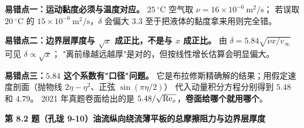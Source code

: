 \begin{yicuo}
\textbf{易错点一：运动黏度必须与温度对应。}
$25\ ^{\circ}\mathrm{C}$ 空气取 $\nu=16\times10^{-6}\ \mathrm{m^2/s}$；
若误取 $20\ ^{\circ}\mathrm{C}$ 的 $15\times10^{-6}\ \mathrm{m^2/s}$，$\delta$ 会偏大 3.3%
至于把液体的黏度拿来用则完全错。

\textbf{易错点二：边界层厚度与 $\sqrt{x}$ 成正比，不是与 $x$ 成正比。}
由 $\delta=5.84\sqrt{\nu x/v_\infty}$ 可见 $\delta\propto\sqrt{x}$；
"离前缘越远越厚"是对的，但按线性增长估算会明显偏大。

\textbf{易错点三：$5.84$ 这个系数有"口径"问题。}
它是布拉修斯精确解的结果；用假定速度剖面（抛物线 $2\eta-\eta^{2}$、正弦 $\sin(\pi\eta/2)$）
代入动量积分方程分别得到 $5.48$ 和 $4.79$。
2021 年真题卷面给出的是 $5.48/\sqrt{\mathrm{Re}_x}$，\textbf{卷面给哪个就用哪个}。
\end{yicuo}

\noindent\textbf{第 8.2 题（孔珑 9-10）\quad 油流纵向绕流薄平板的总摩擦阻力与边界层厚度}

